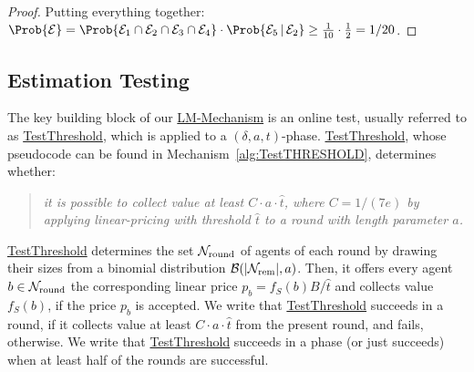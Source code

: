 \begin{proof}
%
Putting everything together:
%
$\Prob{\mathcal{E}} = \Prob{\Event_1 \cap \Event_2 \cap \Event_3 \cap \Event_4} \cdot \Prob{\Event_5 \,|\,\Event_2} \geq \frac{1}{10} \cdot \frac{1}{2} = 1/20$.
%
\end{proof}



\subsection{Estimation Testing}
\label{sec:estimate}

The key building block of our \hyperref[alg:LMMECH]{LM-Mechanism} is an online test, usually referred to as \hyperref[alg:TestTHRESHOLD]{TestThreshold}, which is applied to a $(\delta,a,t)$-phase. \hyperref[alg:TestTHRESHOLD]{TestThreshold}, whose pseudocode can be found in Mechanism~\ref{alg:TestTHRESHOLD}, determines whether:

\begin{quote}
    \textit{it is possible to collect value at least $C\cdot a\cdot \hat{t}$, where $C = 1/(7e)$ by applying linear-pricing with threshold $\hat{t}$ to a round with length parameter $a$.}
\end{quote}

\hyperref[alg:TestTHRESHOLD]{TestThreshold} determines the set $\mathcal{N}_{\text{round}}$ of agents of each round by drawing their sizes from a binomial distribution $\mathcal{B}(|\mathcal{N}_{\text{rem}}|, a)$. Then, it offers every agent $b \in \mathcal{N}_{\text{round}}$ the corresponding linear price $p_b = f_S(b) B /\hat{t}$ and collects value $f_S(b)$, if the price $p_b$ is accepted. We write that \hyperref[alg:TestTHRESHOLD]{TestThreshold} succeeds in a round, if it collects value at least  $C\cdot a\cdot \hat{t}$ from the present round, and fails, otherwise. We write that \hyperref[alg:TestTHRESHOLD]{TestThreshold} succeeds in a phase (or just succeeds) when at least half of the rounds are successful.

